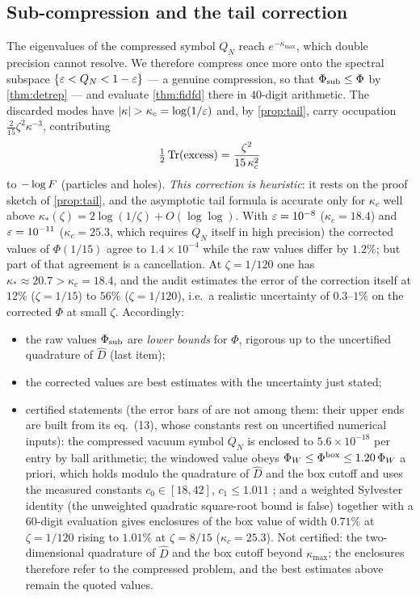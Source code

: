\subsection{Sub-compression and the tail correction}
The eigenvalues of the compressed symbol $Q_N$ reach $e^{-\kappa_{\max}}$, which
double precision cannot resolve.  We therefore compress once more onto the
spectral subspace $\{\varepsilon<Q_N<1-\varepsilon\}$ --- a genuine compression, so that
$\Phi_{\rm sub}\le\Phi$ by \cref{thm:detrep} --- and evaluate \cref{thm:fidfd}
there in $40$-digit arithmetic.  The discarded modes have $|\kappa|>\kappa_c
=\log(1/\eps)$ and, by \cref{prop:tail}, carry occupation
$\frac2{15}\zeta^2\kappa^{-3}$, contributing
\begin{equation}\label{eq:tailcorr}
 \tfrac12\operatorname{Tr}(\text{excess})=\frac{\zeta^2}{15\,\kappa_c^2}
\end{equation}
to $-\log F$ (particles and holes).  \emph{This correction is heuristic}: it
rests on the proof sketch of \cref{prop:tail}, and the asymptotic tail formula is
accurate only for $\kappa_c$ well above $\kappa_*(\zeta)=2\log(1/\zeta)
+O(\log\log)$.  With $\varepsilon=10^{-8}$ ($\kappa_c=18.4$) and $\varepsilon=10^{-11}$
($\kappa_c=25.3$, which requires $Q_N$ itself in high precision) the corrected
values of $\Phi(1/15)$ agree to $1.4\times10^{-4}$ while the raw values differ by
$1.2\%$; but part of that agreement is a cancellation.  At $\zeta=1/120$ one has
$\kappa_*\approx20.7>\kappa_c=18.4$, and the audit \cite{RigorCN5N} estimates the
error of the correction itself at $12\%$ ($\zeta=1/15$) to $56\%$
($\zeta=1/120$), i.e.\ a realistic uncertainty of $0.3$--$1\%$ on the corrected
$\Phi$ at small $\zeta$.  Accordingly:
\begin{itemize}
\item the raw values $\Phi_{\rm sub}$ are \emph{lower bounds} for $\Phi$, rigorous up to the uncertified quadrature of $\widehat D$ (last item);
\item the corrected values are best estimates with the uncertainty just stated;
\item certified statements \cite{RigorCN} (the error bars of \cite{RigorTB} are not among them: their upper ends are built from its eq.~(13), whose constants rest on uncertified numerical inputs): the compressed vacuum symbol $Q_N$ is enclosed to $5.6\times10^{-18}$ per entry by ball arithmetic; the windowed value obeys $\Phi_W\le\Phi^{\rm box}\le1.20\,\Phi_W$ a priori, which holds modulo the quadrature of $\widehat D$ and the box cutoff and uses the measured constants $c_0\in[18,42]$, $c_1\le1.011$ \cite[\S9, item (C2), and Correction~C2]{RigorCN}; and a weighted Sylvester identity (the unweighted quadratic square-root bound is false) together with a 60-digit evaluation gives enclosures of the box value of width $0.71\%$ at $\zeta=1/120$ rising to $1.01\%$ at $\zeta=8/15$ ($\kappa_c=25.3$).  Not certified: the two-dimensional quadrature of $\widehat D$ and the box cutoff beyond $\kappa_{\max}$; the enclosures therefore refer to the compressed problem, and the best estimates above remain the quoted values.
\end{itemize}
